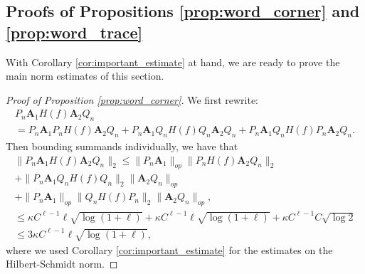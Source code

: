 \documentclass[11pt]{amsart}
\theoremstyle{plain}
\theoremstyle{remark}
\numberwithin{equation}{section}
\begin{document}
\subsection{Proofs of Propositions \ref{prop:word_corner} and \ref{prop:word_trace}}
With Corollary \ref{cor:important_estimate} at hand, we are ready to prove the main norm estimates of this section.
\begin{proof}[Proof of Proposition \ref{prop:word_corner}]
We first rewrite:
\begin{multline}
P_n \mathbf{A}_1 H(f)\mathbf{A}_2 Q_n
\\=P_n \mathbf{A}_1 P_n H(f) \mathbf{A}_2 Q_n
+ P_n \mathbf{A}_1 Q_n H(f) Q_n \mathbf{A}_2 Q_n
+ P_n \mathbf{A}_1 Q_n H(f) P_n \mathbf{A}_2 Q_n.
\end{multline}
Then bounding summands individually, we have that
\begin{multline}
\|P_n \mathbf{A}_1 H(f)\mathbf{A}_2 Q_n\|_2
\leq
\|P_n \mathbf{A}_1\|_{op} \|P_n H(f) \mathbf{A}_2 Q_n\|_{2}
\\+ \|P_n \mathbf{A}_1 Q_n H(f) Q_n\|_2 \| \mathbf{A}_2 Q_n\|_{op}
\\+ \|P_n \mathbf{A}_1\|_{op} \|Q_n H(f) P_n\|_2 \|\mathbf{A}_2 Q_n\|_{op},
\\ \leq \kappa C^{\ell-1} \ell \sqrt{\log(1+\ell)} + \kappa C^{\ell-1} \ell \sqrt{\log(1+\ell)}+ \kappa C^{\ell-1} C\sqrt{\log 2}
\\
\leq 3\kappa C^{\ell-1} \ell \sqrt{\log(1+\ell)},
\end{multline} 
where we used Corollary
\ref{cor:important_estimate} for the estimates on the Hilbert-Schmidt norm.
\end{proof}
%
%
%
\end{document}
